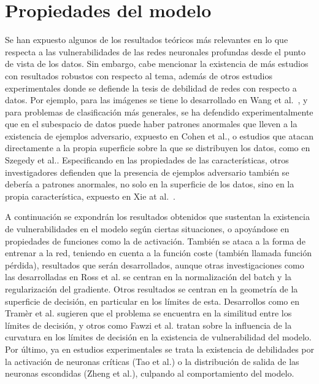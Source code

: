 \section{Propiedades del modelo}
Se han expuesto algunos de los resultados teóricos más relevantes en lo que respecta a las vulnerabilidades de las redes neuronales profundas desde el punto de vista de los datos. Sin embargo, cabe mencionar la existencia de más estudios con resultados robustos con respecto al tema, además de otros estudios experimentales donde se defiende la tesis de debilidad de redes con respecto a datos. Por ejemplo, para las imágenes se tiene lo desarrollado en Wang et al.~\cite{ImageProp}, y para problemas de clasificación más generales, se ha defendido experimentalmente que en el subespacio de datos puede haber patrones anormales que lleven a la existencia de ejemplos adversario, expuesto en Cohen et al.\cite{AbPatternSubspace}, o estudios que atacan directamente a la propia superficie sobre la que se distribuyen los datos, como en Szegedy et al.\cite{DataManifold}. Especificando en las propiedades de las características, otros investigadores defienden que la presencia de ejemplos adversario también se debería a patrones anormales, no solo en la superficie de los datos, sino en la propia característica, expuesto en Xie at al.~\cite{AbnorPatterns}.

A continuación se expondrán los resultados obtenidos que sustentan la existencia de vulnerabilidades en el modelo según ciertas situaciones, o apoyándose en propiedades de funciones como la de activación. También se ataca a la forma de entrenar a la red, teniendo en cuenta a la función coste (también llamada función pérdida), resultados que serán desarrollados, aunque otras investigaciones como las desarrolladas en Ross et al.\cite{BatchReg} se centran en la normalización del batch y la regularización del gradiente. Otros resultados se centran en la geometría de la superficie de decisión, en particular en los límites de esta. Desarrollos como en Tramèr et al.\cite{Simil} sugieren que el problema se encuentra en la similitud entre los límites de decisión, y otros como Fawzi et al.\cite{CURVATURE} tratan sobre la influencia de la curvatura en los límites de decisión en la existencia de vulnerabilidad del modelo. Por último, ya en estudios experimentales se trata la existencia de debilidades por la activación de neuronas críticas (Tao et al.\cite{Criticneur}) o la distribución de salida de las neuronas escondidas (Zheng et al.\cite{HiddenNeur}), culpando al comportamiento del modelo.

